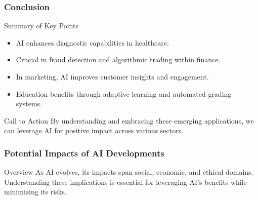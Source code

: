 \documentclass[aspectratio=169]{beamer}
\begin{document}
\begin{frame}[fragile]
    \frametitle{Conclusion}
    \begin{block}{Summary of Key Points}
        \begin{itemize}
            \item AI enhances diagnostic capabilities in healthcare.
            \item Crucial in fraud detection and algorithmic trading within finance.
            \item In marketing, AI improves customer insights and engagement.
            \item Education benefits through adaptive learning and automated grading systems.
        \end{itemize}
    \end{block}
    \begin{block}{Call to Action}
        By understanding and embracing these emerging applications, we can leverage AI for positive impact across various sectors.
    \end{block}
\end{frame}

\begin{frame}[fragile]
    \frametitle{Potential Impacts of AI Developments}
    \begin{block}{Overview}
        As AI evolves, its impacts span social, economic, and ethical domains. Understanding these implications is essential for leveraging AI's benefits while minimizing its risks.
    \end{block}
\end{frame}
\end{document}
